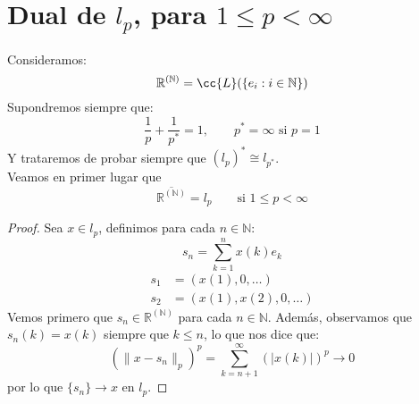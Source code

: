 \chapter{Dual de $l_p$, para $1\leq p < \infty$}
Consideramos:
\begin{equation*}
    \mathbb{R}^{(\mathbb{N})} = \cc{L}(\{e_i : i \in \mathbb{N}\})
\end{equation*}
Supondremos siempre que:
\begin{equation*}
    \dfrac{1}{p} + \dfrac{1}{p^\ast} = 1, \qquad p^\ast = \infty \text{\ si\ } p = 1
\end{equation*}
Y trataremos de probar siempre que ${(l_p)}^{\ast} \cong l_{p^\ast}$.\\

\noindent
Veamos en primer lugar que
\begin{equation*}
    \overline{\mathbb{R}^{(\mathbb{N})}} = l_p \qquad \text{si\ } 1 \leq p < \infty
\end{equation*}
\begin{proof}
    Sea $x\in l_p$, definimos para cada $n\in \mathbb{N}$:
    \begin{equation*}
        s_n = \sum_{k=1}^{n} x(k)e_k
    \end{equation*}
    \begin{align*}
        s_1 &= (x(1), 0, \ldots) \\
        s_2 &= (x(1), x(2), 0,\ldots)
    \end{align*}
    Vemos primero que $s_n \in \mathbb{R}^{(\mathbb{N})}$ para cada $n\in \mathbb{N}$. Además, observamos que $s_n(k) = x(k)$ siempre que $k\leq n$, lo que nos dice que:
    \begin{equation*}
        {(\|x-s_n\|_p)}^{p} = \sum_{k=n+1}^{\infty} {(|x(k)|)}^{p} \to 0
    \end{equation*}
    por lo que $\{s_n\}\to x$ en $l_p$.
\end{proof}

